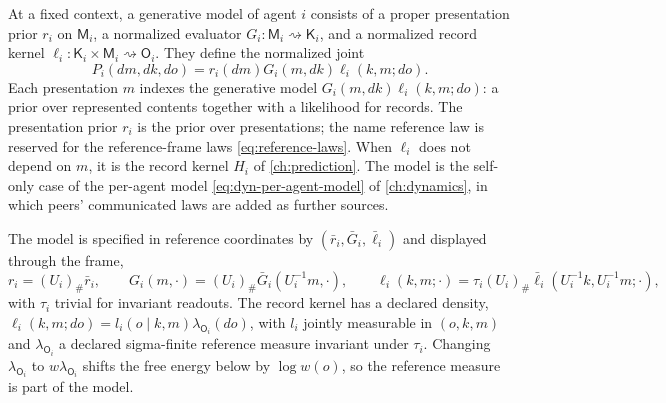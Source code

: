 At a fixed context, a generative model of agent $i$ consists of a proper presentation prior $r_i$ on $\mathsf M_i$, a normalized evaluator $G_i:\mathsf M_i\rightsquigarrow\mathsf K_i$, and a normalized record kernel $\ell_i:\mathsf K_i\times\mathsf M_i\rightsquigarrow\mathsf O_i$. They define the normalized joint
\begin{equation}
 P_i(dm,dk,do)=r_i(dm)G_i(m,dk)\ell_i(k,m;do).
 \label{eq:generative-model}
\end{equation}
Each presentation $m$ indexes the generative model $G_i(m,dk)\ell_i(k,m;do)$: a prior over represented contents together with a likelihood for records. The presentation prior $r_i$ is the prior over presentations; the name reference law is reserved for the reference-frame laws \cref{eq:reference-laws}. When $\ell_i$ does not depend on $m$, it is the record kernel $H_i$ of \cref{ch:prediction}. The model is the self-only case of the per-agent model \cref{eq:dyn-per-agent-model} of \cref{ch:dynamics}, in which peers' communicated laws are added as further sources.

The model is specified in reference coordinates by $(\bar r_i,\bar G_i,\bar\ell_i)$ and displayed through the frame,
\begin{equation}
 r_i=(U_i)_\#\bar r_i,\qquad
 G_i(m,\cdot)=(U_i)_\#\bar G_i(U_i^{-1}m,\cdot),\qquad
 \ell_i(k,m;\cdot)=\tau_i(U_i)_\#\bar\ell_i(U_i^{-1}k,U_i^{-1}m;\cdot),
 \label{eq:model-display}
\end{equation}
with $\tau_i$ trivial for invariant readouts. The record kernel has a declared density, $\ell_i(k,m;do)=l_i(o\mid k,m)\lambda_{\mathsf O_i}(do)$, with $l_i$ jointly measurable in $(o,k,m)$ and $\lambda_{\mathsf O_i}$ a declared sigma-finite reference measure invariant under $\tau_i$. Changing $\lambda_{\mathsf O_i}$ to $w\lambda_{\mathsf O_i}$ shifts the free energy below by $\log w(o)$, so the reference measure is part of the model.

